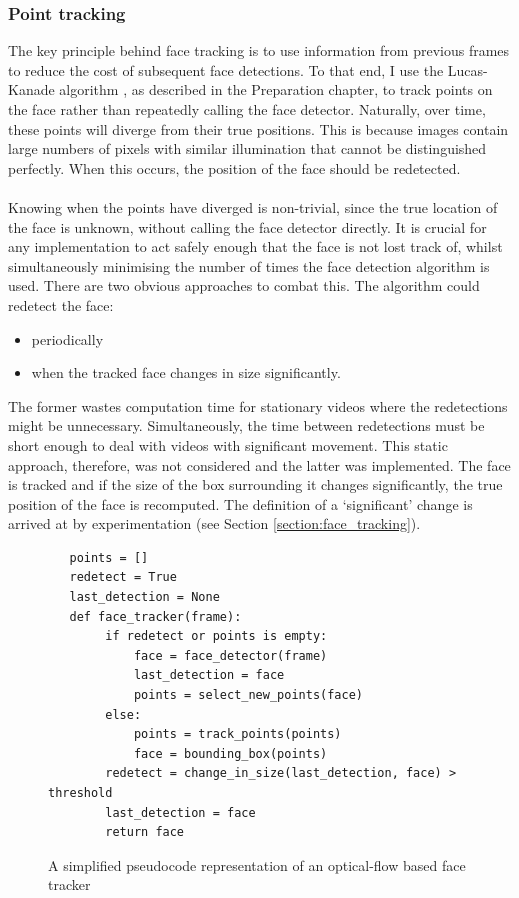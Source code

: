 \subsubsection{Point tracking}
The key principle behind face tracking is to use information from previous frames to reduce the cost of subsequent face detections.
To that end, I use the Lucas-Kanade algorithm \cite{LucasKanade}, as described in the Preparation chapter, to track points on the face rather than repeatedly calling the face detector. Naturally, over time, these points will diverge from their true positions. This is because images contain large numbers of pixels with similar illumination that cannot be distinguished perfectly. When this occurs, the position of the face should be redetected. 
\\ \\
Knowing when the points have diverged is non-trivial, since the true location of the face is unknown, without calling the face detector directly. It is crucial for any implementation to act safely enough that the face is not lost track of, whilst simultaneously minimising the number of times the face detection algorithm is used.
There are two obvious approaches to combat this. The algorithm could redetect the face: 
\begin{itemize}
    \item periodically 
    \item when the tracked face changes in size significantly. 
\end{itemize}
The former wastes computation time for stationary videos where the redetections might be unnecessary. Simultaneously, the time between redetections must be short enough to deal with videos with significant movement. This static approach, therefore, was not considered and the latter was implemented. The face is tracked and if the size of the box surrounding it changes significantly, the true position of the face is recomputed. The definition of a `significant' change is arrived at by experimentation (see Section \ref{section:face_tracking}).
\begin{figure}[H]
\centering
\begin{verbatim}
   points = []
   redetect = True
   last_detection = None
   def face_tracker(frame):
        if redetect or points is empty:
            face = face_detector(frame) 
            last_detection = face
            points = select_new_points(face)
        else:
            points = track_points(points)
            face = bounding_box(points)
        redetect = change_in_size(last_detection, face) > threshold
        last_detection = face
        return face
\end{verbatim}
\caption{A simplified pseudocode representation of an optical-flow based face tracker}
\end{figure} 
